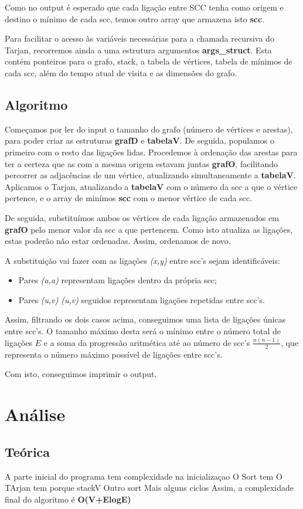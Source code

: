 \documentclass[12pt,a4paper]{article}
\begin{document}
Como no output é esperado que cada ligação entre SCC tenha como origem e destino o mínimo de cada scc, temos outro array que armazena isto \textbf{scc}.

Para facilitar o acesso às variáveis necessárias para a chamada recursiva do Tarjan, recorremos ainda a uma estrutura argumentos \textbf{args\_struct}. Esta contém ponteiros para o grafo, stack, a tabela de vértices, tabela de mínimos de cada scc, além do tempo atual de visita e as dimensões do grafo.
\subsection{Algoritmo}
Começamos por ler do input o tamanho do grafo (número de vértices e arestas), para poder criar as estruturas \textbf{grafD} e \textbf{tabelaV}. De seguida, populamos o primeiro com o resto das ligações lidas.
Procedemos à ordenação das arestas para ter a certeza que as com a mesma origem estavam juntas \textbf{grafO}, facilitando percorrer as adjacências de um vértice, atualizando simultaneamente a \textbf{tabelaV}.
Aplicamos o Tarjan, atualizando a \textbf{tabelaV} com o número da scc a que o vértice pertence, e o array de minímos \textbf{scc} com o menor vértice de cada scc.

De seguida, substituímos ambos os vértices de cada ligação armazenados em \textbf{grafO} pelo menor valor da scc a que pertencem.
Como isto atualiza as ligações, estas poderão não estar ordenadas. Assim, ordenamos de novo.

A substituição vai fazer com as ligações \textit{(x,y)} entre scc's sejam identificáveis:
\begin{itemize}
	\item Pares \textit{(a,a)} representam ligações dentro da própria scc;
	\item Pares \textit{(u,v)} \textit{(u,v)} seguidos representam ligações repetidas entre scc's.
\end{itemize}
Assim, filtrando os dois casos acima, conseguimos uma lista de ligações únicas entre scc's.
O tamanho máximo desta será o mínimo entre o número total de ligações $E$ e a soma da progressão aritmética até ao número de scc's $\frac{n(n-1)}{2}$,
que representa o número máximo possível de ligações entre scc's.

Com isto, conseguimos imprimir o output.
\section{Análise}
\subsection{Teórica}
A parte inicial do programa tem complexidade na inicializaçao
O Sort tem
O TArjan tem porque stackV
Outro sort
Mais alguns ciclos
Assim, a complexidade final do algoritmo é \textbf{O(V+ElogE)}
\end{document}
